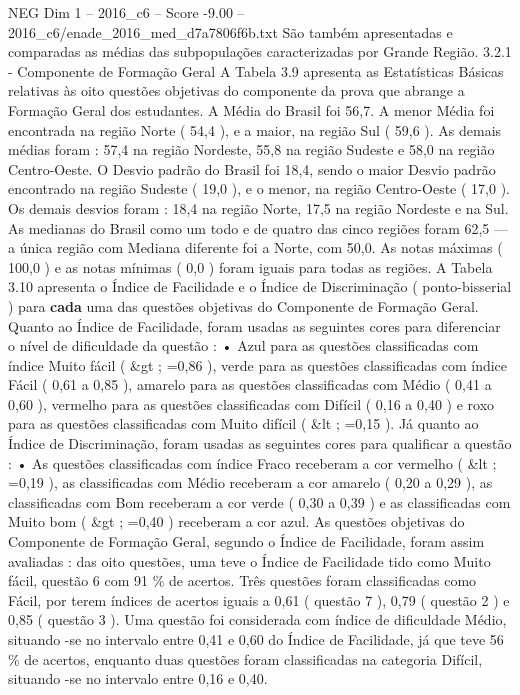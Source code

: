 \begin{textsample}{NEG Dim 1 – 2016\_c6 – Score -9.00 – 2016\_c6/enade\_2016\_med\_d7a7806f6b.txt}
São também apresentadas e comparadas as médias das subpopulações caracterizadas por Grande Região. 3.2.1 - Componente de Formação Geral A Tabela 3.9 apresenta as Estatísticas Básicas relativas às oito questões objetivas do componente da prova que abrange a Formação Geral dos estudantes.
A Média do Brasil foi 56,7.
A menor Média foi encontrada na região Norte ( 54,4 ), e a maior, na região Sul ( 59,6 ).
As demais médias foram : 57,4 na região Nordeste, 55,8 na região Sudeste e 58,0 na região Centro-Oeste.
O Desvio padrão do Brasil foi 18,4, sendo o maior Desvio padrão encontrado na região Sudeste ( 19,0 ), e o menor, na região Centro-Oeste ( 17,0 ).
Os demais desvios foram : 18,4 na região Norte, 17,5 na região Nordeste e na Sul.
As medianas do Brasil como um todo e de quatro das cinco regiões foram 62,5 — a única região com Mediana diferente foi a Norte, com 50,0.
As notas máximas ( 100,0 ) e as notas mínimas ( 0,0 ) foram iguais para todas as regiões.
A Tabela 3.10 apresenta o Índice de Facilidade e o Índice de Discriminação ( ponto-bisserial ) para \textbf{cada} uma das questões objetivas do Componente de Formação Geral.
Quanto ao Índice de Facilidade, foram usadas as seguintes cores para diferenciar o nível de dificuldade da questão : • Azul para as questões classificadas com índice Muito fácil ( \&gt ; =0,86 ), verde para as questões classificadas com índice Fácil ( 0,61 a 0,85 ), amarelo para as questões classificadas com Médio ( 0,41 a 0,60 ), vermelho para as questões classificadas com Difícil ( 0,16 a 0,40 ) e roxo para as questões classificadas com Muito difícil ( \&lt ; =0,15 ).
Já quanto ao Índice de Discriminação, foram usadas as seguintes cores para qualificar a questão : • As questões classificadas com índice Fraco receberam a cor vermelho ( \&lt ; =0,19 ), as classificadas com Médio receberam a cor amarelo ( 0,20 a 0,29 ), as classificadas com Bom receberam a cor verde ( 0,30 a 0,39 ) e as classificadas com Muito bom ( \&gt ; =0,40 ) receberam a cor azul.
As questões objetivas do Componente de Formação Geral, segundo o Índice de Facilidade, foram assim avaliadas : das oito questões, uma teve o Índice de Facilidade tido como Muito fácil, questão 6 com 91 \% de acertos.
Três questões foram classificadas como Fácil, por terem índices de acertos iguais a 0,61 ( questão 7 ), 0,79 ( questão 2 ) e 0,85 ( questão 3 ).
Uma questão foi considerada com índice de dificuldade Médio, situando -se no intervalo entre 0,41 e 0,60 do Índice de Facilidade, já que teve 56 \% de acertos, enquanto duas questões foram classificadas na categoria Difícil, situando -se no intervalo entre 0,16 e 0,40.

\end{textsample}

